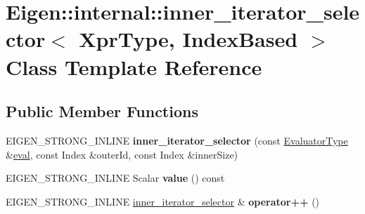 \hypertarget{class_eigen_1_1internal_1_1inner__iterator__selector_3_01_xpr_type_00_01_index_based_01_4}{}\section{Eigen\+::internal\+::inner\+\_\+iterator\+\_\+selector$<$ Xpr\+Type, Index\+Based $>$ Class Template Reference}
\label{class_eigen_1_1internal_1_1inner__iterator__selector_3_01_xpr_type_00_01_index_based_01_4}
\subsection*{Public Member Functions}
\begin{DoxyCompactItemize}
\item 
\mbox{\label{class_eigen_1_1internal_1_1inner__iterator__selector_3_01_xpr_type_00_01_index_based_01_4_af77e170b977ca20a28ebf67f7225e234}} 
E\+I\+G\+E\+N\+\_\+\+S\+T\+R\+O\+N\+G\+\_\+\+I\+N\+L\+I\+NE {\bfseries inner\+\_\+iterator\+\_\+selector} (const \mbox{\hyperlink{struct_eigen_1_1internal_1_1evaluator}{Evaluator\+Type}} \&\mbox{\hyperlink{struct_eigen_1_1internal_1_1eval}{eval}}, const Index \&outer\+Id, const Index \&inner\+Size)
\item 
\mbox{\label{class_eigen_1_1internal_1_1inner__iterator__selector_3_01_xpr_type_00_01_index_based_01_4_a313c47fa4b4f34974c9dd2b31e200e21}} 
E\+I\+G\+E\+N\+\_\+\+S\+T\+R\+O\+N\+G\+\_\+\+I\+N\+L\+I\+NE Scalar {\bfseries value} () const
\item 
\mbox{\label{class_eigen_1_1internal_1_1inner__iterator__selector_3_01_xpr_type_00_01_index_based_01_4_a1ae5c9b870a5068a9bdd9a91e80495cd}} 
E\+I\+G\+E\+N\+\_\+\+S\+T\+R\+O\+N\+G\+\_\+\+I\+N\+L\+I\+NE \mbox{\hyperlink{class_eigen_1_1internal_1_1inner__iterator__selector}{inner\+\_\+iterator\+\_\+selector}} \& {\bfseries operator++} ()
\item 
\mbox{\label{class_eigen_1_1internal_1_1inner__iterator__selector_3_01_xpr_type_00_01_index_based_01_4_a3404ae052ff041d9fed4fefd1f68394c}} 

\end{DoxyCompactItemize}
